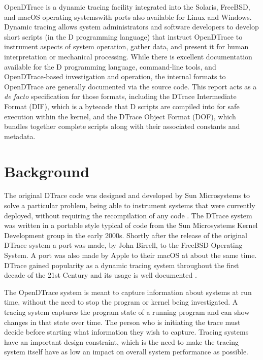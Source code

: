 OpenDTrace is a dynamic tracing facility integrated into the Solaris,
FreeBSD, and macOS operating systems\textemdash with ports also available for
Linux and Windows.  Dynamic tracing allows system administrators and
software developers to develop short scripts (in the D programming
language) that instruct OpenDTrace to instrument aspects of system
operation, gather data, and present it for human interpretation or
mechanical processing.  While there is excellent documentation
available for the D programming language, command-line tools, and
OpenDTrace-based investigation and operation, the internal formats to
OpenDTrace are generally documented via the source code.  This report
acts as a \textit{de facto} specification for those formats, including the
DTrace Intermediate Format (DIF), which is a bytecode that D scripts
are compiled into for safe execution within the kernel, and the DTrace
Object Format (DOF), which bundles together complete scripts along
with their associated constants and metadata.

\section{Background}

The original DTrace code was designed and developed by Sun
Microsystems to solve a particular problem, being able to instrument
systems that were currently deployed, without requiring the
recompilation of any code \cite{DTrace2004}.  The DTrace system was
written in a portable style typical of code from the Sun Microsystems
Kernel Development group in the early 2000s.  Shortly after the
release of the original DTrace system a port was made, by John Birrell,
to the FreeBSD Operating System.  A port was also made by Apple to
their macOS at about the same time.  DTrace gained popularity as a
dynamic tracing system throughout the first decade of the 21st Century
and its usage is well documented
\cite{mckusick2014design}\cite{Microsystems2008a}\cite{Gregg:2011:DDT:1971960}.

The OpenDTrace system is meant to capture information about systems at
run time, without the need to stop the program or kernel being
investigated.
A tracing system captures the program state of a running program and
can show changes in that state over time.  The person who is
initiating the trace must decide before starting what information they
wish to capture.  Tracing systems have an important design constraint,
which is the need to make the tracing system itself have as low an
impact on overall system performance as possible.

